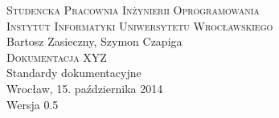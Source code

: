 \documentclass[12pt,a4paper]{report}
\begin{document}
\begin{titlepage}
\begin{center}
\textsc{Studencka Pracownia Inżynierii Oprogramowania}\\[0.5cm]
\textsc{Instytut Informatyki Uniwersytetu Wrocławskiego}\\[8cm]

Bartosz Zasieczny, Szymon Czapiga\\[1.0cm]

\textsc{\LARGE{Dokumentacja XYZ}}\\[1.0cm]

Standardy dokumentacyjne\\[8.5cm]

Wrocław, 15. października 2014\\[0.5cm]
Wersja 0.5
\end{center}
\end{titlepage}
\end{document}
